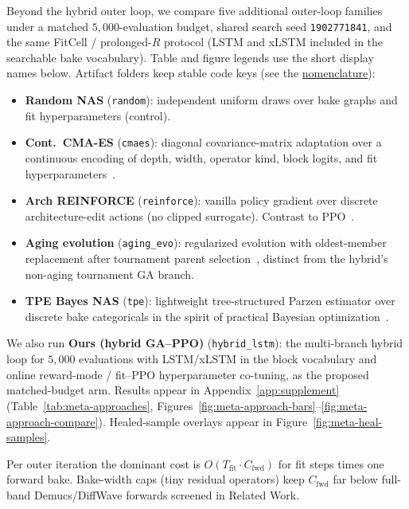 Beyond the hybrid outer loop, we compare five additional outer-loop families under a matched $5{,}000$-evaluation budget, shared search seed \texttt{1902771841}, and the same FitCell / prolonged-$R$ protocol (LSTM and xLSTM included in the searchable bake vocabulary).
Table and figure legends use the short display names below. Artifact folders keep stable code keys (see the \href{https://github.com/reeldemo/denoise-opt-meta/blob/master/paper/Unsupervised_Wrap-Discontinuity_Repair_in_Wavetable_Synthesis_via_Hybrid_GA-PPO_Meta-Search_v12/NOMENCLATURE.md}{nomenclature}):
\begin{itemize}
  \item \textbf{Random NAS} (\texttt{random}): independent uniform draws over bake graphs and fit hyperparameters (control).
  \item \textbf{Cont.\ CMA-ES} (\texttt{cmaes}): diagonal covariance-matrix adaptation over a continuous encoding of depth, width, operator kind, block logits, and fit hyperparameters~\cite{hansen2016cmaes}.
  \item \textbf{Arch REINFORCE} (\texttt{reinforce}): vanilla policy gradient over discrete architecture-edit actions (no clipped surrogate). Contrast to PPO~\cite{schulman2017,zoph2017nas}.
  \item \textbf{Aging evolution} (\texttt{aging\_evo}): regularized evolution with oldest-member replacement after tournament parent selection~\cite{real2017large,real2019}, distinct from the hybrid's non-aging tournament GA branch.
  \item \textbf{TPE Bayes NAS} (\texttt{tpe}): lightweight tree-structured Parzen estimator over discrete bake categoricals in the spirit of practical Bayesian optimization~\cite{snoek2012}.
\end{itemize}
We also run \textbf{Ours (hybrid GA--PPO)} (\texttt{hybrid\_lstm}): the multi-branch hybrid loop for $5{,}000$ evaluations with LSTM/xLSTM in the block vocabulary and online reward-mode / fit--PPO hyperparameter co-tuning, as the proposed matched-budget arm.
Results appear in Appendix~\ref{app:supplement} (Table~\ref{tab:meta-approaches}, Figures~\ref{fig:meta-approach-bars}--\ref{fig:meta-approach-compare}). Healed-sample overlays appear in Figure~\ref{fig:meta-heal-samples}.

\begin{remark}
\label{rem:complexity}
Per outer iteration the dominant cost is $O(T_{\mathrm{fit}}\cdot C_{\mathrm{fwd}})$ for fit steps times one forward bake.
Bake-width caps (tiny residual operators) keep $C_{\mathrm{fwd}}$ far below full-band Demucs/DiffWave forwards screened in Related Work.
\end{remark}

